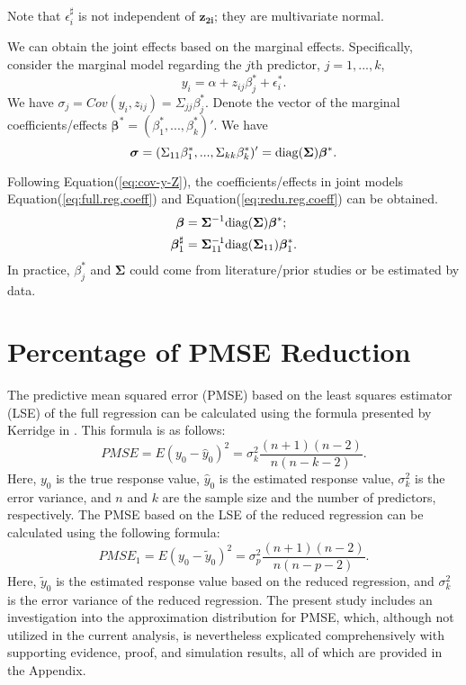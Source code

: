 Note that $\epsilon_i^\sharp$ is not independent of $\boldsymbol{z_{2i}}$; they are multivariate normal.

We can obtain the joint effects based on the marginal effects. Specifically, consider the marginal model regarding the $j$th predictor, $j=1, ..., k$,
\begin{equation}
y_i = \alpha + z_{ij}\beta_j^* + \epsilon_i^*.
\end{equation}
We have $\sigma_j = Cov(y_i, z_{ij}) = \Sigma_{jj} \beta_j^*$. 
Denote the vector of the marginal coefficients/effects $\boldsymbol{\beta}^* = (\beta_1^*, ..., \beta_k^*)'$. We have
\begin{equation}
\label{eq:cov-y-Z}
\boldsymbol{\sigma} = (\Sigma_{11}\beta^*_1, ...,  \Sigma_{kk}\beta^*_k)' = {\rm diag}(\boldsymbol{\Sigma})\boldsymbol{\beta}^*.
\end{equation}

Following Equation(\ref{eq:cov-y-Z}), the coefficients/effects in joint models Equation(\ref{eq:full.reg.coeff}) and Equation(\ref{eq:redu.reg.coeff}) can be obtained.
\begin{align}
\label{eq:jointBetaByMarg}
\boldsymbol{\beta} &= \boldsymbol{\Sigma}^{-1}{\rm diag}(\boldsymbol{\Sigma})\boldsymbol{\beta}^*; \\
\boldsymbol{\beta}_1^\sharp &= \boldsymbol{\Sigma}_{11}^{-1} {\rm diag}(\boldsymbol{\Sigma}_{11})\boldsymbol{\beta}^*_1.
\end{align}
In practice, $\beta_j^*$ and $\boldsymbol{\Sigma}$ could come from literature/prior studies or be estimated by data.

\section{Percentage of PMSE Reduction}

The predictive mean squared error (PMSE) based on the least squares estimator (LSE) of the full regression can be calculated using the formula presented by Kerridge in \cite{kerridge1967errors}. This formula is as follows:
\begin{equation}\label{equation:PMSE}
PMSE = E(y_0 - \hat{y}_0)^2 = \sigma_k^2 \frac{(n+1)(n-2)}{n(n-k-2)}.
\end{equation}
Here, $y_0$ is the true response value, $\hat{y}_0$ is the estimated response value, $\sigma_k^2$ is the error variance, and $n$ and $k$ are the sample size and the number of predictors, respectively.
The PMSE based on the LSE of the reduced regression can be calculated using the following formula:
\begin{equation}\label{equation:PMSE1}
PMSE_1 = E(y_0 - \tilde{y}_0)^2 = \sigma_p^2 \frac{(n+1)(n-2)}{n(n-p-2)}.
\end{equation}
Here, $\tilde{y}_0$ is the estimated response value based on the reduced regression, and $\sigma_k^2$ is the error variance of the reduced regression. 
The present study includes an investigation into the approximation distribution for PMSE, which, although not utilized in the current analysis, is nevertheless explicated comprehensively with supporting evidence, proof, and simulation results, all of which are provided in the Appendix.

